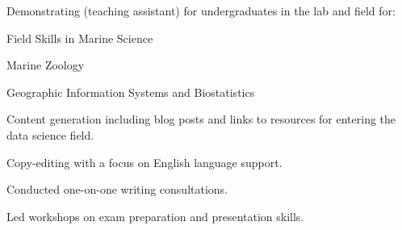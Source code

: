 \documentclass[a4paper]{deedy-resume} %
\begin{document}
\begin{flushleft}


\sectionspace
\sectionspace


Demonstrating (teaching assistant) for undergraduates in the lab and field for:
\begin{tightitemize}
\item Field Skills in Marine Science
\item Marine Zoology
\item Geographic Information Systems and Biostatistics
\end{tightitemize}


\sectionspace


Content generation including blog posts and links to resources for entering the data science field.

\sectionspace



Copy-editing with a focus on English language support.

\sectionspace



\begin{tightitemize}
\item Conducted one-on-one writing consultations.
\item Led workshops on exam preparation and presentation skills.
\end{tightitemize}

\sectionspace %



\end{flushleft}
\end{document}
